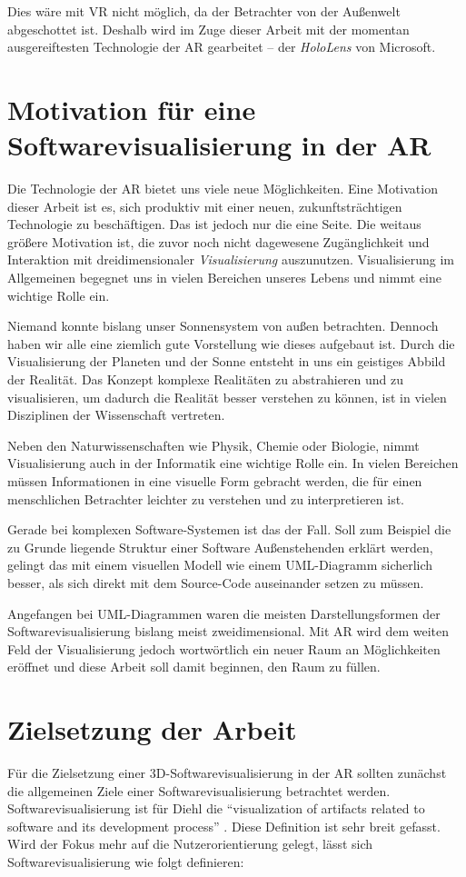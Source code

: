 Dies wäre mit VR nicht möglich, da der Betrachter von der Außenwelt abgeschottet ist. Deshalb wird im Zuge dieser Arbeit mit der momentan ausgereiftesten Technologie der AR gearbeitet -- der \emph{HoloLens} von Microsoft.

\section{Motivation für eine Softwarevisualisierung in der AR}
Die Technologie der AR bietet uns viele neue Möglichkeiten. Eine Motivation dieser Arbeit ist es, sich produktiv mit einer neuen, zukunftsträchtigen Technologie zu beschäftigen. Das ist jedoch nur die eine Seite. Die weitaus größere Motivation ist, die zuvor noch nicht dagewesene Zugänglichkeit und Interaktion mit dreidimensionaler \emph{Visualisierung} auszunutzen. Visualisierung im Allgemeinen begegnet uns in vielen Bereichen unseres Lebens und nimmt eine wichtige Rolle ein.

Niemand konnte bislang unser Sonnensystem von außen betrachten. Dennoch haben wir alle eine ziemlich gute Vorstellung wie dieses aufgebaut ist. Durch die Visualisierung der Planeten und der Sonne entsteht in uns ein geistiges Abbild der Realität. Das Konzept komplexe Realitäten zu abstrahieren und zu visualisieren, um dadurch die Realität besser verstehen zu können, ist in vielen Disziplinen der Wissenschaft vertreten.

Neben den Naturwissenschaften wie Physik, Chemie oder Biologie, nimmt Visualisierung auch in der Informatik eine wichtige Rolle ein. In vielen Bereichen müssen Informationen in eine visuelle Form gebracht werden, die für einen menschlichen Betrachter leichter zu verstehen und zu interpretieren ist.

Gerade bei komplexen Software-Systemen ist das der Fall. Soll zum Beispiel die zu Grunde liegende Struktur einer Software Außenstehenden erklärt werden, gelingt das mit einem visuellen Modell wie einem UML-Diagramm sicherlich besser, als sich direkt mit dem Source-Code auseinander setzen zu müssen.

Angefangen bei UML-Diagrammen waren die meisten Darstellungsformen der Softwarevisualisierung bislang meist zweidimensional. Mit AR wird dem weiten Feld der Visualisierung jedoch wortwörtlich ein neuer Raum an Möglichkeiten eröffnet und diese Arbeit soll damit beginnen, den Raum zu füllen.

\section{Zielsetzung der Arbeit}
Für die Zielsetzung einer 3D-Softwarevisualisierung in der AR sollten zunächst die allgemeinen Ziele einer Softwarevisualisierung betrachtet werden. Softwarevisualisierung ist für Diehl die "`visualization of artifacts related to software and its development process"' \cite{diehl2007software}. Diese Definition ist sehr breit gefasst. Wird der Fokus mehr auf die Nutzerorientierung gelegt, lässt sich Softwarevisualisierung wie folgt definieren:

